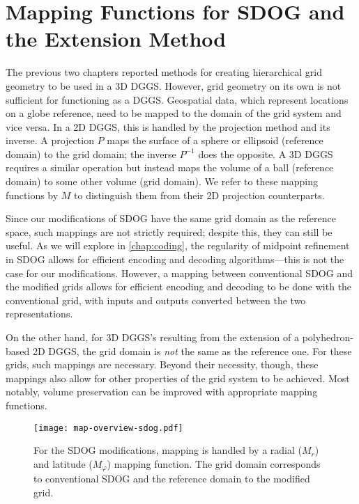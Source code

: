 \chapter{Mapping Functions for SDOG and the Extension Method} \label{chap:mapping}
The previous two chapters reported methods for creating hierarchical grid geometry to be used in a 3D DGGS.
However, grid geometry on its own is not sufficient for functioning as a DGGS.
Geospatial data, which represent locations on a globe reference, need to be mapped to the domain of the grid system and vice versa.
In a 2D DGGS, this is handled by the projection method and its inverse.
A projection $P$ maps the surface of a sphere or ellipsoid (reference domain) to the grid domain; the inverse $P^{-1}$ does the opposite.
A 3D DGGS requires a similar operation but instead maps the volume of a ball (reference domain) to some other volume (grid domain).
We refer to these mapping functions by $M$ to distinguish them from their 2D projection counterparts.


Since our modifications of SDOG have the same grid domain as the reference space, such mappings are not strictly required; despite this, they can still be useful.
As we will explore in \cref{chap:coding}, the regularity of midpoint refinement in SDOG allows for efficient encoding and decoding algorithms---this is not the case for our modifications.
However, a mapping between conventional SDOG and the modified grids allows for efficient encoding and decoding to be done with the conventional grid, with inputs and outputs converted between the two representations.


On the other hand, for 3D DGGS's resulting from the extension of a polyhedron-based 2D DGGS, the grid domain is \textit{not} the same as the reference one.
For these grids, such mappings are necessary.
Beyond their necessity, though, these mappings also allow for other properties of the grid system to be achieved. Most notably, volume preservation can be improved with appropriate mapping functions.


\begin{figure}[ht!]
	\centering
	\texttt{[image: map-overview-sdog.pdf]}
	\caption[The role of mapping functions for the SDOG modifications]{
		For the SDOG modifications, mapping is handled by a radial ($M_r$) and latitude ($M_\varphi$) mapping function.
		The grid domain corresponds to conventional SDOG and the reference domain to the modified grid.
	}
	\label{fig:map-overview-sdog}
\end{figure}


